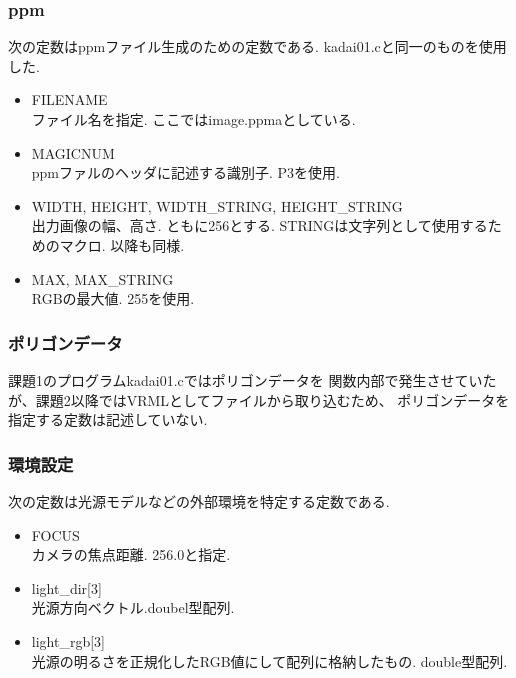 \documentclass[a4j,dvipdfmx]{jsarticle}
\begin{document}
\subsubsection{ppm}
次の定数はppmファイル生成のための定数である.
kadai01.cと同一のものを使用した.
\begin{itemize}
\item FILENAME\\
  ファイル名を指定. ここではimage.ppmaとしている.
  
\item MAGICNUM\\
  ppmファルのヘッダに記述する識別子. P3を使用.
  
\item WIDTH, HEIGHT, WIDTH\_STRING, HEIGHT\_STRING\\
  出力画像の幅、高さ. ともに256とする. STRINGは文字列として使用するためのマクロ.
  以降も同様.
  
\item MAX, MAX\_STRING\\
  RGBの最大値. 255を使用.

\end{itemize}

\subsubsection{ポリゴンデータ}
課題1のプログラムkadai01.cではポリゴンデータを
関数内部で発生させていたが、課題2以降ではVRMLとしてファイルから取り込むため、
ポリゴンデータを指定する定数は記述していない.

\subsubsection{環境設定}
次の定数は光源モデルなどの外部環境を特定する定数である.
\begin{itemize}
\item FOCUS\\
  カメラの焦点距離. 256.0と指定.
  
\item light\_dir[3]\\
  光源方向ベクトル.doubel型配列.
  
\item light\_rgb[3]\\
  光源の明るさを正規化したRGB値にして配列に格納したもの.
  double型配列.
  
\end{itemize}
\end{document}
